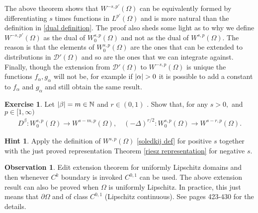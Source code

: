 \documentclass[
    a4paper,
    DIV=14,
    abstract=true,
    numbers=noenddot
]
{scrartcl}
\theoremstyle{definition}
\newtheorem{observation}{Observation}
\newtheorem{exercise}{Exercise}
\newtheorem*{hint}{Hint}
\newcommand{\N}{\mathbb{N}}
\newcommand{\Dd}{\mathcal{D}}
\begin{document}
The above theorem shows that $W^{-s,p'}(\Omega )$ can be equivalently formed by differentiating $s$ times functions in $L^{p'}(\Omega )$ and is more natural than the definition in \eqref{dual definition}. The proof also sheds some light as to why we define $W^{-s,p'}(\Omega )$ as the dual of $W^{s,p}_0(\Omega )$ and not as the dual of $W^{s,p}(\Omega )$. The reason is that the elements of $W^{s,p}_0(\Omega )$ are the ones that can be extended to distributions in $\Dd'(\Omega )$ and so are the ones that we can integrate against. Finally, though the extension from $\Dd'(\Omega )$ to $W^{-s,p}(\Omega )$ is unique the functions $f_\alpha, g_\alpha$ will not be, for example if $\abs{\alpha}>0$ it is possible to add a constant to $f_\alpha$ and $g_\alpha$ and still obtain the same result.

\begin{exercise}
	Let $\abs{\beta }=m \in \N$ and $r \in (0,1)$ .  Show that, for any $s>0,$ and $p \in [1,\infty)$
	\begin{align*}
		D^\beta  : W^{s,p}_0(\Omega ) \to W^{s-m,p}(\Omega ), \quad (-\Delta)^{r/2}  : W^{s,p}_0(\Omega ) \to W^{s-r,p}(\Omega ).
	\end{align*}
\end{exercise}
\begin{hint}
	Apply the definition of $W^{s,p}(\Omega )$ \ref{soledkij def} for positive $s$  together with the just proved representation Theorem \ref{riesz representation} for negative $s$.
\end{hint}


\begin{observation}
	Edit extension theorem for uniformly Lipschitz domains and then whenever $C^k$ boundary is invoked $C^{0,1}$ can be used.	The above extension result can also be proved when $\Omega$ is uniformly Lipschitz. In practice, this just means that $\partial\Omega$ and of class $C^{0,1}$ (Lipschitz continuous). See \cite{leoni2017first} pages 423-430 for the details.
\end{observation}










\end{document}
